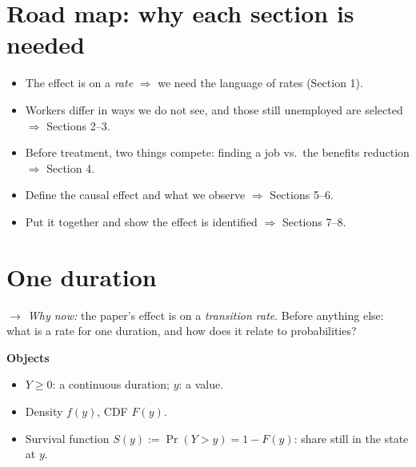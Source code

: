 \documentclass[11pt]{article}
\newcommand{\1}{\mathbf{1}}
\newcommand{\whynow}[1]{\par\noindent\textit{$\rightarrow$ Why now:} #1\par}
\begin{document}
\section*{Road map: why each section is needed}
\begin{itemize}
  \item The effect is on a \emph{rate} $\Rightarrow$ we need the language of rates (Section 1).
  \item Workers differ in ways we do not see, and those still unemployed are selected $\Rightarrow$ Sections 2--3.
  \item Before treatment, two things compete: finding a job vs.\ the benefits reduction $\Rightarrow$ Section 4.
  \item Define the causal effect and what we observe $\Rightarrow$ Sections 5--6.
  \item Put it together and show the effect is identified $\Rightarrow$ Sections 7--8.
\end{itemize}

\section{One duration}
\whynow{the paper's effect is on a \emph{transition rate}. Before anything else: what is a rate for one duration, and how does it relate to probabilities?}

\textbf{Objects}
\begin{itemize}
  \item $Y \ge 0$: a continuous duration; $y$: a value.
  \item Density $f(y)$, CDF $F(y)$.
  \item Survival function $S(y) := \Pr(Y>y) = 1-F(y)$: share still in the state at $y$.
\end{itemize}
\end{document}

